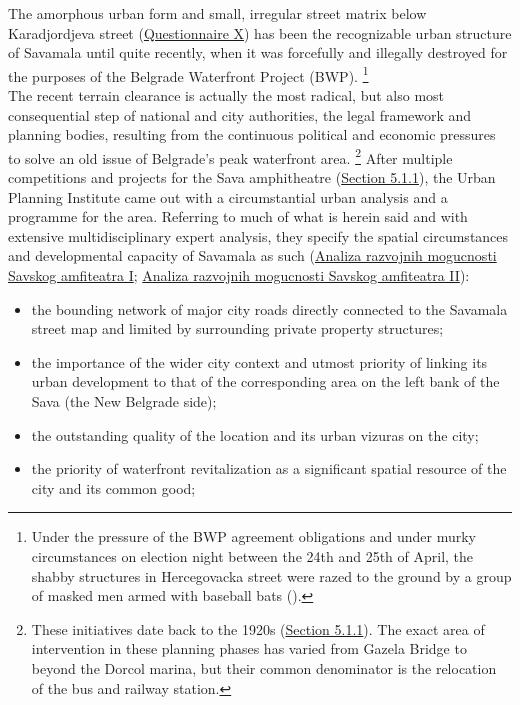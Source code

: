 \documentclass[11pt]{report}
\begin{document}
The amorphous urban form and small, irregular street matrix below Karadjordjeva street (\href{Questionnaire PhD students}{Questionnaire X}) has been the recognizable urban structure of Savamala until quite recently, when it was forcefully and illegally destroyed for the purposes of the Belgrade Waterfront Project (BWP).
\footnote{Under the pressure of the BWP agreement obligations and under murky circumstances on election night between the 24th and 25th of April, the shabby structures in Hercegovacka street were razed to the
ground by a group of masked men armed with baseball bats (\href{ref}{\citealt{popovic_porusili_2016}}).} %
\\

The recent terrain clearance is actually the most radical, but also most consequential step of national and city authorities, the legal framework and planning bodies, resulting from the continuous political and economic pressures to solve an old issue of Belgrade’s peak waterfront area. 
\footnote{These initiatives date back to the 1920s (\href{Section 5.1.1}{Section 5.1.1}).
The exact area of intervention in these planning phases has varied from Gazela Bridge to beyond the Dorcol marina, but their common denominator is the relocation of the bus and railway station.}
After multiple competitions and projects for the Sava amphitheatre  (\href{Section 5.1.1}{Section 5.1.1}), the Urban Planning Institute came out with a circumstantial urban analysis and a programme for the area. Referring to much of what is herein said and with extensive multidisciplinary expert analysis, they specify the spatial circumstances and developmental capacity of Savamala as such  
(\href{Program}{Analiza razvojnih mogucnosti Savskog amfiteatra I}; \href{Program}{Analiza razvojnih mogucnosti Savskog amfiteatra II}):

\begin{itemize}
\item the bounding network of major city roads directly connected to the Savamala street map and limited by surrounding private property structures;
\item the importance of the wider city context and utmost priority of linking its urban development to that of the corresponding area on the left bank of the Sava  (the New Belgrade side);
\item the outstanding quality of the location and its urban vizuras on the city;
\item the priority of waterfront revitalization as a significant spatial resource of the city and its common good;
\end{itemize}
\end{document}
